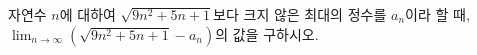 자연수 $n$에 대하여 $\sqrt{9n^2+5n+1}$보다 크지 않은 최대의 정수를 $a_n$이라 할 때, $\displaystyle\lim_{n\to\infty}(\sqrt{9n^2+5n+1}-a_n)$의 값을 구하시오.
